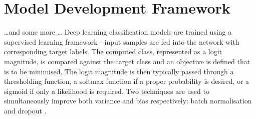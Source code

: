 \section{Model Development Framework}
\dots and some more \dots
Deep learning classification models are trained using a supervised learning framework - input samples are fed into the network with corresponding target labels. The computed class, represented as a logit magnitude, is compared against the target class and an objective is defined that is to be minimised. The logit magnitude is then typically passed through a thresholding function, a softmax function \cite{reference} if a proper probability is desired, or a sigmoid \cite{reference} if only a likelihood is required. Two techniques are used to simultaneously improve both variance and bias respectively: batch normalisation \cite{reference} and dropout \cite{reference}. \newline 
